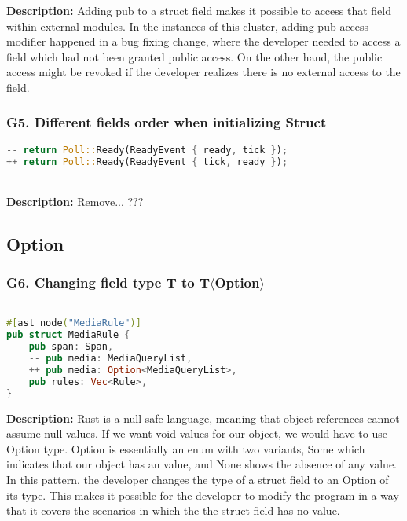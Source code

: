 \noindent \textbf{Description:} Adding pub to a struct field makes it possible to access that field within external modules. In the instances of this cluster, adding pub access modifier happened in a bug fixing change, where the developer needed to access a field which had not been granted public access. On the other hand, the public access might be revoked if the developer realizes there is no external access to the field.

\subsubsection{G5. Different fields order when initializing Struct}

\begin{lstlisting}[language=Rust, style=colouredRust, label={l3}]
-- return Poll::Ready(ReadyEvent { ready, tick });
++ return Poll::Ready(ReadyEvent { tick, ready });

\end{lstlisting} \\

\noindent \textbf{Description:} Remove... ???

\subsection{Option}
\subsubsection{G6. Changing field type T to T$\langle$Option$\rangle$}

\begin{lstlisting}[language=Rust, style=colouredRust, label={l3}]

#[ast_node("MediaRule")]
pub struct MediaRule {
    pub span: Span,
    -- pub media: MediaQueryList,
    ++ pub media: Option<MediaQueryList>,
    pub rules: Vec<Rule>,
}

\end{lstlisting}

\noindent \textbf{Description:} Rust is a null safe language, meaning that object references cannot assume null values. If we want void values for our object, we would have to use Option type. Option is essentially an enum with two variants, Some which indicates that our object has an value, and None shows the absence of any value. In this pattern, the developer changes the type of a struct field to an Option of its type. This makes it possible for the developer to modify the program in a way that it covers the scenarios in which the the struct field has no value.

